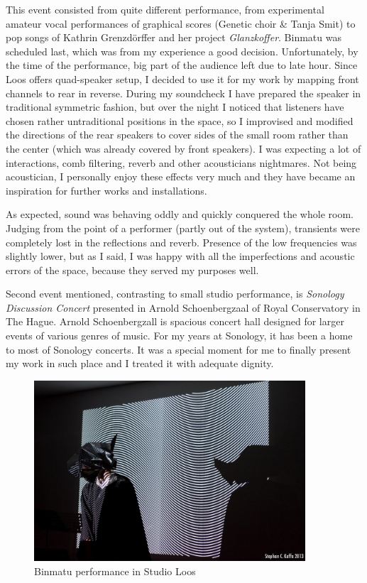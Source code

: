 \documentclass[12pt,a4paper,oneside]{report}
\begin{document}
This event consisted from quite different performance, from experimental amateur vocal performances of graphical scores (Genetic choir \& Tanja Smit) to pop songs of Kathrin Grenzdörffer and her project \emph{Glanzkoffer}. Binmatu was scheduled last, which was from my experience a good decision. Unfortunately, by the time of the performance, big part of the audience left due to late hour. Since Loos offers quad-speaker setup, I decided to use it for my work by mapping front channels to rear in reverse. During my soundcheck I have prepared the speaker in traditional symmetric fashion, but over the night I noticed that listeners have chosen rather untraditional positions in the space, so I improvised and modified the directions of the rear speakers to cover sides of the small room rather than the center (which was already covered by front speakers). I was expecting a lot of interactions, comb filtering, reverb and other acousticians nightmares. Not being acoustician, I personally enjoy these effects very much and they have became an inspiration for further works and installations. 

As expected, sound was behaving oddly and quickly conquered the whole room. Judging from the point of a performer (partly out of the system), transients were completely lost in the reflections and reverb. Presence of the low frequencies was slightly lower, but as I said, I was happy with all the imperfections and acoustic errors of the space, because they served my purposes well.

Second event mentioned, contrasting to small studio performance, is \emph{Sonology Discussion Concert} presented in Arnold Schoenbergzaal of Royal Conservatory in The Hague. Arnold Schoenbergzall is spacious concert hall designed for larger events of various genres of music. For my years at Sonology, it has been a home to most of Sonology concerts. It was a special moment for me to finally present my work in such place and I treated it with adequate dignity.

\begin{figure}  
  \centering
    \includegraphics[width=0.9\textwidth]{img/binmatu_perfo}
	\caption{Binmatu performance in Studio Loos}
	\label{fig:binmatu_perfo}
\end{figure}
\end{document}
